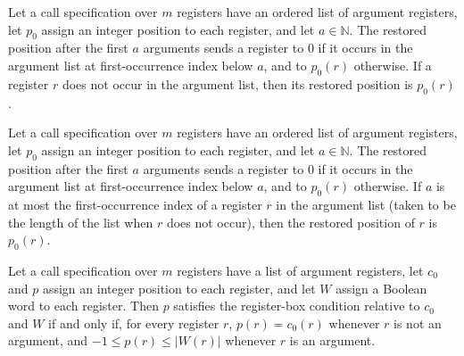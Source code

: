 \begin{lemma}
\label{Complexity.LogProg.retPos_of_not_mem}
\leanok
{}
Let a call specification over $m$ registers have an ordered list of argument registers,
let $p_0$ assign an integer position to each register, and let $a\in\mathbb{N}$. The
restored position after the first $a$ arguments sends a register to $0$ if it occurs in
the argument list at first-occurrence index below $a$, and to $p_0(r)$ otherwise. If a
register $r$ does not occur in the argument list, then its restored position is
$p_0(r)$.
\end{lemma}

\begin{lemma}
\label{Complexity.LogProg.retPos_of_le}
\leanok
{}
Let a call specification over $m$ registers have an ordered list of argument registers,
let $p_0$ assign an integer position to each register, and let $a\in\mathbb{N}$. The
restored position after the first $a$ arguments sends a register to $0$ if it occurs in
the argument list at first-occurrence index below $a$, and to $p_0(r)$ otherwise. If $a$
is at most the first-occurrence index of a register $r$ in the argument list (taken to
be the length of the list when $r$ does not occur), then the restored position of $r$
is $p_0(r)$.
\end{lemma}

\begin{lemma}
\label{Complexity.LogProg.regBox_iff}
\leanok
{}
Let a call specification over $m$ registers have a list of argument registers, let
$c_0$ and $p$ assign an integer position to each register, and let $W$ assign a Boolean
word to each register. Then $p$ satisfies the register-box condition relative to $c_0$
and $W$ if and only if, for every register $r$, $p(r)=c_0(r)$ whenever $r$ is not an
argument, and $-1\le p(r)\le |W(r)|$ whenever $r$ is an argument.
\end{lemma}
